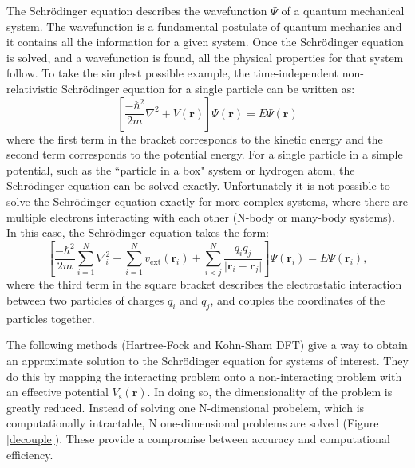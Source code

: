 The Schr\"{o}dinger equation describes the wavefunction $\Psi$ of a quantum mechanical system. The wavefunction is a fundamental postulate of quantum mechanics and it contains all the information for a given system. Once the Schr\"{o}dinger equation is solved, and a wavefunction is found, all the physical properties for that system follow. To take the simplest possible example, the time-independent non-relativistic Schr\"{o}dinger equation for a single particle can be written as:
\begin{equation} \label{singleparticle}
\left[\frac{-\hbar^2}{2m}\nabla^2+V(\textbf{r})\right]\Psi(\textbf{r}) = E\Psi(\textbf{r})
\end{equation}
where the first term in the bracket corresponds to the kinetic energy and the second term corresponds to the potential energy. For a single particle in a simple potential, such as the ``particle in a box" system or hydrogen atom, the Schr\"{o}dinger equation can be solved exactly. Unfortunately it is not possible to solve the Schr\"{o}dinger equation exactly for more complex systems, where there are multiple electrons interacting with each other (N-body or many-body systems). In this case, the Schr\"{o}dinger equation takes the form:
\begin{equation}
\left[\frac{-\hbar^2}{2m}\sum_{i=1}^N\nabla_i^2+\sum_{i=1}^Nv_{\textrm{ext}}(\textbf{r}_i)+\sum_{i<j}^N\frac{q_iq_j}{\lvert\textbf{r}_i-\textbf{r}_j\rvert}\right]\Psi(\textbf{r}_i) = E\Psi(\textbf{r}_i),
\end{equation}
where the third term in the square bracket describes the electrostatic interaction between two particles of charges $q_i$ and $q_j$, and couples the coordinates of the particles together.

The following methods (Hartree-Fock and Kohn-Sham DFT) give a way to obtain an approximate solution to the Schr\"{o}dinger equation for systems of interest. They do this by mapping the interacting problem onto a non-interacting problem with an effective potential $V_\textrm{s}(\textbf{r})$. In doing so, the dimensionality of the problem is greatly reduced. Instead of solving one N-dimensional probelem, which is computationally intractable, N one-dimensional problems are solved (Figure \ref{decouple}). These provide a compromise between accuracy and computational efficiency.

